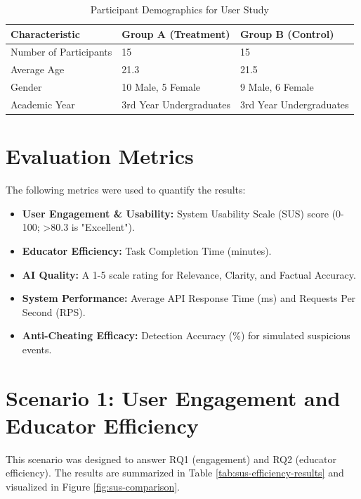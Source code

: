 \begin{table}[htbp]
\centering
\caption{Participant Demographics for User Study}
\label{tab:participant-demographics}
\begin{tabular}{l l l}
\toprule
\textbf{Characteristic} & \textbf{Group A (Treatment)} & \textbf{Group B (Control)} \\
\midrule
Number of Participants & 15 & 15 \\
Average Age & 21.3 & 21.5 \\
Gender & 10 Male, 5 Female & 9 Male, 6 Female \\
Academic Year & 3rd Year Undergraduates & 3rd Year Undergraduates \\
\bottomrule
\end{tabular}
\end{table}

\section{Evaluation Metrics}
\label{sec:eval-metrics}
The following metrics were used to quantify the results:
\begin{itemize}
    \item \textbf{User Engagement \& Usability:} System Usability Scale (SUS) score (0-100; >80.3 is "Excellent").
    \item \textbf{Educator Efficiency:} Task Completion Time (minutes).
    \item \textbf{AI Quality:} A 1-5 scale rating for Relevance, Clarity, and Factual Accuracy.
    \item \textbf{System Performance:} Average API Response Time (ms) and Requests Per Second (RPS).
    \item \textbf{Anti-Cheating Efficacy:} Detection Accuracy (\%) for simulated suspicious events.
\end{itemize}

\section{Scenario 1: User Engagement and Educator Efficiency}
\label{sec:eval-scenario1}
This scenario was designed to answer RQ1 (engagement) and RQ2 (educator efficiency). The results are summarized in Table \ref{tab:sus-efficiency-results} and visualized in Figure \ref{fig:sus-comparison}.

